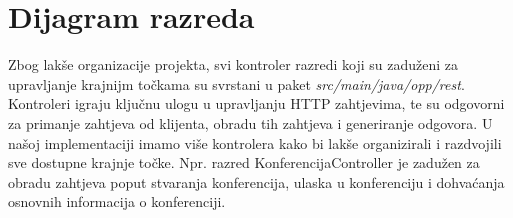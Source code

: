 			\eject


		\section{Dijagram razreda}

		Zbog lakše organizacije projekta, svi kontroler razredi koji su zaduženi za upravljanje krajnijm točkama su svrstani u paket \textit{ src/main/java/opp/rest}. Kontroleri igraju ključnu ulogu u upravljanju HTTP zahtjevima, te su odgovorni za primanje zahtjeva od klijenta, obradu tih zahtjeva i generiranje odgovora. U našoj implementaciji imamo više kontrolera kako bi lakše organizirali i razdvojili sve dostupne krajnje točke. Npr. razred KonferencijaController je zadužen za obradu zahtjeva poput stvaranja konferencija, ulaska u konferenciju i dohvaćanja osnovnih informacija o konferenciji.

